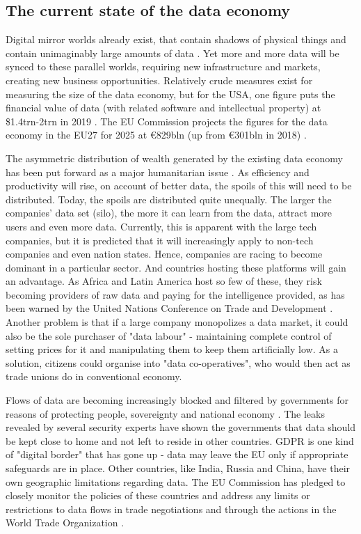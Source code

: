 \subsection{The current state of the data economy  \statusgreen} \label{sec:dataeconomy}

Digital mirror worlds already exist, that contain shadows of physical things and contain unimaginably large amounts of data \cite{MirrorWorlds2020Feb}. Yet more and more data will be synced to these parallel worlds, requiring new infrastructure and markets, creating new business opportunities. Relatively crude measures exist for measuring the size of the data economy, but for the USA, one figure puts the financial value of data (with related software and intellectual property) at \$1.4trn-2trn in 2019 \cite{MirrorWorlds2020Feb}. The EU Commission projects the figures for the data economy in the EU27 for 2025 at €829bln (up from €301bln in 2018) \cite{EUDataStrategy2020Feb}. 

The asymmetric distribution of wealth generated by the existing data economy has been put forward as a major humanitarian issue \cite{TheWinner2020Feb}. As efficiency and productivity will rise, on account of better data, the spoils of this will need to be distributed. Today, the spoils are distributed quite unequally. The larger the companies' data set (silo), the more it can learn from the data, attract more users and even more data. Currently, this is apparent with the large tech companies, but it is predicted that it will increasingly apply to non-tech companies and even nation states. Hence, companies are racing to become dominant in a particular sector. And countries hosting these platforms will gain an advantage. As Africa and Latin America host so few of these, they risk becoming providers of raw data and paying for the intelligence provided, as has been warned by the United Nations Conference on Trade and Development \cite{TheWinner2020Feb}. Another problem is that if a large company monopolizes a data market, it could also be the sole purchaser of "data labour" - maintaining complete control of setting prices for it and manipulating them to keep them artificially low. As a solution, citizens could organise into "data co-operatives", who would then act as trade unions do in conventional economy. 

Flows of data are becoming increasingly blocked and filtered by governments for reasons of protecting people, sovereignty and national economy \cite{VirtualNationalism2020Feb}. The leaks revealed by several security experts have shown the governments that data should be kept close to home and not left to reside in other countries. GDPR is one kind of "digital border" that has gone up - data may leave the EU only if appropriate safeguards are in place. Other countries, like India, Russia and China, have their own geographic limitations regarding data. The EU Commission has pledged to closely monitor the policies of these countries and address any limits or restrictions to data flows in trade negotiations and through the actions in the World Trade Organization \cite{EUWhitePaperAI2020Feb}.

